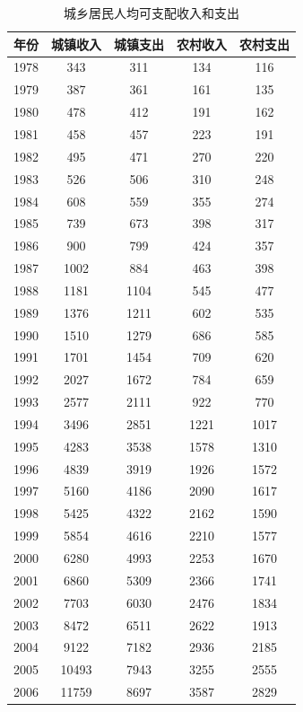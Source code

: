 \documentclass{article}
\begin{document}
\begin{appendices}
\begin{table}[H]
  \centering
  \caption{城乡居民人均可支配收入和支出}
  \label{tab:3} 
  \begin{tabular}{ccccc}
    \hline
    \textbf{年份} & \textbf{城镇收入} & \textbf{城镇支出} & \textbf{农村收入} & \textbf{农村支出} \\
    \hline
    1978 & 343 & 311 & 134 & 116 \\
    1979 & 387 & 361 & 161 & 135 \\
    1980 & 478 & 412 & 191 & 162 \\
    1981 & 458 & 457 & 223 & 191 \\
    1982 & 495 & 471 & 270 & 220 \\
    1983 & 526 & 506 & 310 & 248 \\
    1984 & 608 & 559 & 355 & 274 \\
    1985 & 739 & 673 & 398 & 317 \\
    1986 & 900 & 799 & 424 & 357 \\
    1987 & 1002 & 884 & 463 & 398 \\
    1988 & 1181 & 1104 & 545 & 477 \\
    1989 & 1376 & 1211 & 602 & 535 \\
    1990 & 1510 & 1279 & 686 & 585 \\
    1991 & 1701 & 1454 & 709 & 620 \\
    1992 & 2027 & 1672 & 784 & 659 \\
    1993 & 2577 & 2111 & 922 & 770 \\
    1994 & 3496 & 2851 & 1221 & 1017 \\
    1995 & 4283 & 3538 & 1578 & 1310 \\
    1996 & 4839 & 3919 & 1926 & 1572 \\
    1997 & 5160 & 4186 & 2090 & 1617 \\
    1998 & 5425 & 4322 & 2162 & 1590 \\
    1999 & 5854 & 4616 & 2210 & 1577 \\
    2000 & 6280 & 4993 & 2253 & 1670 \\
    2001 & 6860 & 5309 & 2366 & 1741 \\
    2002 & 7703 & 6030 & 2476 & 1834 \\
    2003 & 8472 & 6511 & 2622 & 1913 \\
    2004 & 9122 & 7182 & 2936 & 2185 \\
    2005 & 10493 & 7943 & 3255 & 2555 \\
    2006 & 11759 & 8697 & 3587 & 2829 \\

\end{tabular}
\end{table}
\end{appendices}
\end{document}
